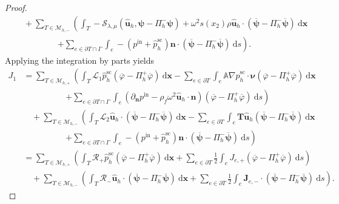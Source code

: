 \documentclass[final,3p,times]{elsarticle}
\begin{document}
\begin{proof}
\begin{align*}
		& \quad + \sum_{T \in \mathscr{M}_{h, -}}
		\left(\int_T-\mathcal{S}_{\lambda,\mu}\left(\hat{\boldsymbol{u}}_h, \boldsymbol{\psi}-\Pi_h^-\boldsymbol{\psi}\right)+ \omega^2 s(x_2) \rho  \hat{\boldsymbol{u}}_h
		\cdot\left(\overline{\boldsymbol{\psi}}-\Pi_h^-\overline{\boldsymbol{\psi}}\right) \mathrm{~d} \boldsymbol{x}\right. \\
		& \quad \qquad\qquad \left.+\sum_{e \in \partial T \cap \Gamma} \int_e-\left(p^\mathrm{in}+ \hat{p}^{\mathrm{sc}}_h\right) \boldsymbol{n} \cdot\left(\overline{\boldsymbol{\psi}}-\Pi_h^-\overline{\boldsymbol{\psi}}\right) \mathrm{~d} s\right).
	\end{align*}
	Applying the integration by parts yields
	\begin{align*}
		{J}_1 &= \sum_{T \in \mathscr{M}_{h, +}}  \left(\int_T \mathcal{L}_1 \hat{p}^{\mathrm{sc}}_h\left(\overline{\varphi}-\Pi_h^+\overline{\varphi} \right) \mathrm{~d} \boldsymbol{x}\right.- \sum_{e \in \partial T}\int_e \mathbb{A} \nabla \hat{p}^{\mathrm{sc}}_h \cdot \boldsymbol{\nu}(\overline{\varphi}-\Pi_h^+\overline{\varphi}) \mathrm{~d} \boldsymbol{x} \\
		& \quad\qquad\qquad \left.+\sum_{e \in \partial T \cap \Gamma}  \int_e\left(\partial_{\boldsymbol{n}} p^\mathrm{in}-\rho_f \omega^2 \hat{\boldsymbol{u}}_h \cdot \boldsymbol{n}\right)\left(\overline{\varphi}-\Pi_h^+\overline{\varphi}\right) \mathrm{~d} s\right) \\
		&\quad + \sum_{T \in \mathscr{M}_{h, -}}\left(\int_T\mathcal{L}_2 \hat{\boldsymbol{u}}_h\cdot\left(\overline{\boldsymbol{\psi}}-\Pi_h^-\overline{\boldsymbol{\psi}}\right) \mathrm{~d} \boldsymbol{x}\right.-\sum_{e \in \partial T}\int_e \boldsymbol{T} \hat{\boldsymbol{u}}_h\left(\overline{\boldsymbol{\psi}}-\Pi_h^-\overline{\boldsymbol{\psi}}\right) \mathrm{~d} \boldsymbol{x} \\
		& \quad\qquad\qquad \left.+\sum_{e \in \partial T \cap \Gamma} \int_e-\left(p^\mathrm{in}+ \hat{p}^{\mathrm{sc}}_h\right) \boldsymbol{n} \cdot\left(\overline{\boldsymbol{\psi}}-\Pi_h^-\overline{\boldsymbol{\psi}}\right) \mathrm{~d} s\right)\\
		& =\sum_{T \in \mathscr{M}_{h, +}}
		\left(\int_T \mathcal{R}_+\hat{p}^{\mathrm{sc}}_h\left(\overline{\varphi}-\Pi_h^+\overline{\varphi} \right) \mathrm{~d} \boldsymbol{x}+\sum_{e \in \partial T} \frac{1}{2} \int_e J_{e, +}\left(\overline{\varphi}-\Pi_h^+\overline{\varphi} \right) \mathrm{~d} s\right) \\
		&\quad +\sum_{T \in \mathscr{M}_{h, -}}\left(\int_T \mathcal{R}_- \hat{\boldsymbol{u}}_h \cdot\left(\overline{\boldsymbol{\psi}}-\Pi_h^-\overline{\boldsymbol{\psi}}\right) \mathrm{~d} \boldsymbol{x}+\sum_{e \in \partial T} \frac{1}{2} \int_e \boldsymbol{J}_{e, -} \cdot\left(\overline{\boldsymbol{\psi}}-\Pi_h^-\overline{\boldsymbol{\psi}}\right) \mathrm{~d} s\right).

\end{align*}
\end{proof}
\end{document}
